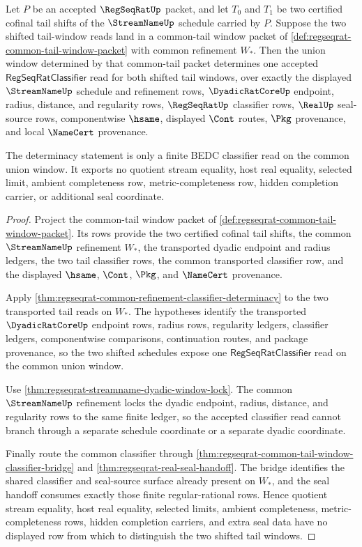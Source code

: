 \begin{theorem}
\label{thm:regseqrat-common-tail-union-classifier-determinacy}
Let $P$ be an accepted $\RegSeqRatUp$ packet, and let $T_0$ and $T_1$ be two certified cofinal tail shifts of the $\StreamNameUp$ schedule carried by $P$. Suppose the two shifted tail-window reads land in a common-tail window packet of \autoref{def:regseqrat-common-tail-window-packet} with common refinement $W_\ast$. Then the union window determined by that common-tail packet determines one accepted $\mathsf{RegSeqRatClassifier}$ read for both shifted tail windows, over exactly the displayed $\StreamNameUp$ schedule and refinement rows, $\DyadicRatCoreUp$ endpoint, radius, distance, and regularity rows, $\RegSeqRatUp$ classifier rows, $\RealUp$ seal-source rows, componentwise $\hsame$, displayed $\Cont$ routes, $\Pkg$ provenance, and local $\NameCert$ provenance.

The determinacy statement is only a finite BEDC classifier read on the common union window. It exports no quotient stream equality, host real equality, selected limit, ambient completeness row, metric-completeness row, hidden completion carrier, or additional seal coordinate.
\end{theorem}
\begin{proof}
Project the common-tail window packet of \autoref{def:regseqrat-common-tail-window-packet}. Its rows provide the two certified cofinal tail shifts, the common $\StreamNameUp$ refinement $W_\ast$, the transported dyadic endpoint and radius ledgers, the two tail classifier rows, the common transported classifier row, and the displayed $\hsame$, $\Cont$, $\Pkg$, and $\NameCert$ provenance.

Apply \autoref{thm:regseqrat-common-refinement-classifier-determinacy} to the two transported tail reads on $W_\ast$. The hypotheses identify the transported $\DyadicRatCoreUp$ endpoint rows, radius rows, regularity ledgers, classifier ledgers, componentwise comparisons, continuation routes, and package provenance, so the two shifted schedules expose one $\mathsf{RegSeqRatClassifier}$ read on the common union window.

Use \autoref{thm:regseqrat-streamname-dyadic-window-lock}. The common $\StreamNameUp$ refinement locks the dyadic endpoint, radius, distance, and regularity rows to the same finite ledger, so the accepted classifier read cannot branch through a separate schedule coordinate or a separate dyadic coordinate.

Finally route the common classifier through \autoref{thm:regseqrat-common-tail-window-classifier-bridge} and \autoref{thm:regseqrat-real-seal-handoff}. The bridge identifies the shared classifier and seal-source surface already present on $W_\ast$, and the seal handoff consumes exactly those finite regular-rational rows. Hence quotient stream equality, host real equality, selected limits, ambient completeness, metric-completeness rows, hidden completion carriers, and extra seal data have no displayed row from which to distinguish the two shifted tail windows.
\end{proof}

